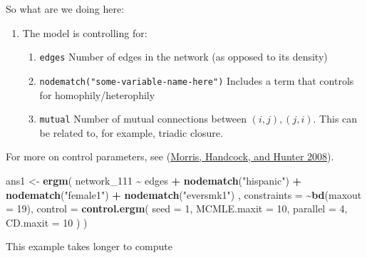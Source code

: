 \documentclass[
]{book}
\newenvironment{Shaded}{\begin{snugshade}}{\end{snugshade}}
\newcommand{\AttributeTok}[1]{\textcolor[rgb]{0.13,0.29,0.53}{#1}}
\newcommand{\DecValTok}[1]{\textcolor[rgb]{0.00,0.00,0.81}{#1}}
\newcommand{\FunctionTok}[1]{\textcolor[rgb]{0.13,0.29,0.53}{\textbf{#1}}}
\newcommand{\NormalTok}[1]{#1}
\newcommand{\OtherTok}[1]{\textcolor[rgb]{0.56,0.35,0.01}{#1}}
\newcommand{\SpecialCharTok}[1]{\textcolor[rgb]{0.81,0.36,0.00}{\textbf{#1}}}
\newcommand{\StringTok}[1]{\textcolor[rgb]{0.31,0.60,0.02}{#1}}
\begin{document}
So what are we doing here:

\begin{enumerate}
\def\labelenumi{\arabic{enumi}.}
\item
  The model is controlling for:

  \begin{enumerate}
  \def\labelenumii{\alph{enumii}.}
  \item
    \texttt{edges} Number of edges in the network (as opposed to its density)
  \item
    \texttt{nodematch("some-variable-name-here")} Includes a term that controls for homophily/heterophily
  \item
    \texttt{mutual} Number of mutual connections between \((i, j), (j, i)\). This can be related to, for example, triadic closure.
  \end{enumerate}
\end{enumerate}

For more on control parameters, see (\protect\hyperlink{ref-Morris2008}{Morris, Handcock, and Hunter 2008}).

\begin{Shaded}
\begin{Highlighting}[]
\NormalTok{ans1 }\OtherTok{\textless{}{-}} \FunctionTok{ergm}\NormalTok{(}
\NormalTok{  network\_111 }\SpecialCharTok{\textasciitilde{}}
\NormalTok{    edges }\SpecialCharTok{+}
    \FunctionTok{nodematch}\NormalTok{(}\StringTok{"hispanic"}\NormalTok{) }\SpecialCharTok{+}
    \FunctionTok{nodematch}\NormalTok{(}\StringTok{"female1"}\NormalTok{) }\SpecialCharTok{+}
    \FunctionTok{nodematch}\NormalTok{(}\StringTok{"eversmk1"}\NormalTok{)}
\NormalTok{    ,}
  \AttributeTok{constraints =} \SpecialCharTok{\textasciitilde{}}\FunctionTok{bd}\NormalTok{(}\AttributeTok{maxout =} \DecValTok{19}\NormalTok{),}
  \AttributeTok{control =} \FunctionTok{control.ergm}\NormalTok{(}
    \AttributeTok{seed        =} \DecValTok{1}\NormalTok{,}
    \AttributeTok{MCMLE.maxit =} \DecValTok{10}\NormalTok{,}
    \AttributeTok{parallel    =} \DecValTok{4}\NormalTok{,}
    \AttributeTok{CD.maxit    =} \DecValTok{10}
\NormalTok{    )}
\NormalTok{  )}
\end{Highlighting}
\end{Shaded}

This example takes longer to compute
\end{document}

